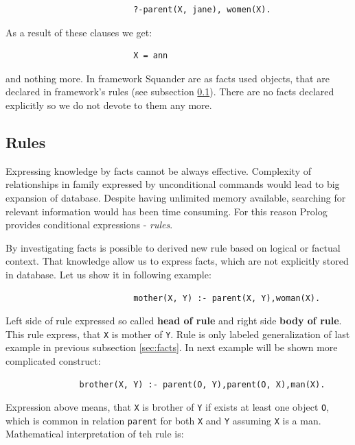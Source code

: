 \documentclass[11pt,twoside,a4paper]{book}
\begin{document}
\begin{verbatim}
                          ?-parent(X, jane), women(X).
\end{verbatim}
As a result of these clauses we get:

\begin{verbatim}
                          X = ann
\end{verbatim}
and nothing more. In framework Squander are as facts used objects, that are
declared in framework's rules (see subsection \ref{sec:rules}). There are no
facts declared explicitly so we do not devote to them any more.

\subsection{Rules}
\label{sec:rules}
Expressing knowledge by facts cannot be always effective. Complexity of
relationships in family expressed by unconditional commands would lead to
big expansion of database. Despite having unlimited memory available, searching
for relevant information would has been time consuming. For this reason Prolog
provides conditional expressions - \textit{rules}.

By investigating facts is possible to derived new rule based on logical or
factual context. That knowledge allow us to express facts, which are not
explicitly stored in database. Let us show it in following example:

\begin{verbatim}
                          mother(X, Y) :- parent(X, Y),woman(X).
\end{verbatim}
Left side of rule expressed so called \textbf{head of rule} and right side
\textbf{body of rule}. This rule express, that \verb|X| is mother of \verb|Y|.
Rule is only labeled generalization of last example in previous subsection \ref{sec:facts}.
In next example will be shown more complicated construct:

\begin{verbatim}
               brother(X, Y) :- parent(O, Y),parent(O, X),man(X).
\end{verbatim}
Expression above means, that \verb|X| is brother of \verb|Y| if exists at least
one object \verb|O|, which is common in relation \verb|parent| for both \verb|X|
and \verb|Y| assuming \verb|X| is a man. Mathematical interpretation of teh
rule is:
\begin{center}
\end{center}
\end{document}
